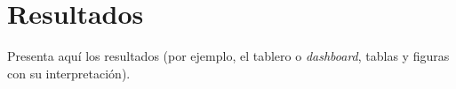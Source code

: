 
\chapter{Resultados}

Presenta aquí los resultados (por ejemplo, el tablero o \textit{dashboard}, tablas y figuras con su interpretación). \lipsum[8]
